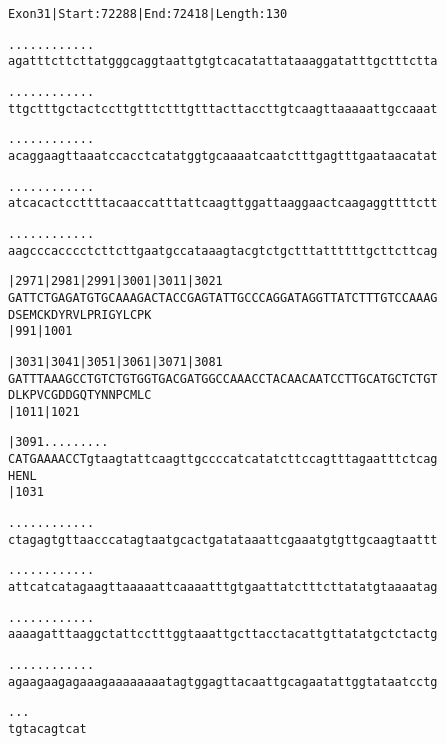 \documentclass{article}
\begin{document}
\newpage
\begin{alltt}
Exon 31 | Start: 72288 | End: 72418 | Length: 130

.    .    .    .    .    .    .    .    .    .    .    .
agatttcttcttatgggcaggtaattgtgtcacatattataaaggatatttgctttctta



.    .    .    .    .    .    .    .    .    .    .    .
ttgctttgctactccttgtttctttgtttacttaccttgtcaagttaaaaattgccaaat



.    .    .    .    .    .    .    .    .    .    .    .
acaggaagttaaatccacctcatatggtgcaaaatcaatctttgagtttgaataacatat



.    .    .    .    .    .    .    .    .    .    .    .
atcacactccttttacaaccatttattcaagttggattaaggaactcaagaggttttctt



.    .    .    .    .    .    .    .    .    .    .    .
aagcccacccctcttcttgaatgccataaagtacgtctgctttattttttgcttcttcag



      |2971     |2981     |2991     |3001     |3011     |3021
GATTCTGAGATGTGCAAAGACTACCGAGTATTGCCCAGGATAGGTTATCTTTGTCCAAAG
D  S  E  M  C  K  D  Y  R  V  L  P  R  I  G  Y  L  C  P  K
      |991                          |1001

      |3031     |3041     |3051     |3061     |3071     |3081
GATTTAAAGCCTGTCTGTGGTGACGATGGCCAAACCTACAACAATCCTTGCATGCTCTGT
D  L  K  P  V  C  G  D  D  G  Q  T  Y  N  N  P  C  M  L  C
      |1011                         |1021

      |3091    .    .    .    .    .    .    .    .    .
CATGAAAACCTgtaagtattcaagttgccccatcatatcttccagtttagaatttctcag
H  E  N  L
      |1031

\end{alltt}
\newpage
\begin{alltt}
.    .    .    .    .    .    .    .    .    .    .    .
ctagagtgttaacccatagtaatgcactgatataaattcgaaatgtgttgcaagtaattt



.    .    .    .    .    .    .    .    .    .    .    .
attcatcatagaagttaaaaattcaaaatttgtgaattatctttcttatatgtaaaatag



.    .    .    .    .    .    .    .    .    .    .    .
aaaagatttaaggctattcctttggtaaattgcttacctacattgttatatgctctactg



.    .    .    .    .    .    .    .    .    .    .    .
agaagaagagaaagaaaaaaaatagtggagttacaattgcagaatattggtataatcctg



.    .    .
tgtacagtcat


\end{alltt}
\end{document}
